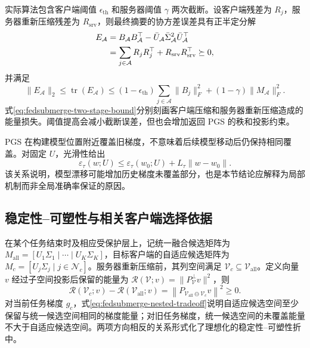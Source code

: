 实际算法包含客户端阈值 $\epsilon_{\mathrm{th}}$ 和服务器阈值 $\gamma$ 两次截断。设客户端残差为 $R_j$，服务器重新压缩残差为 $R_{\mathrm{srv}}$，则最终摘要的协方差误差具有正半定分解
\begin{align}
E_{\mathcal{A}}
&=
B_{\mathcal{A}}B_{\mathcal{A}}^{\top}
-
\bar U_{\mathcal{A}}\bar\Sigma_{\mathcal{A}}^2
\bar U_{\mathcal{A}}^{\top}
\notag\\
&=
\sum_{j\in\mathcal{A}}R_jR_j^{\top}
+
R_{\mathrm{srv}}R_{\mathrm{srv}}^{\top}
\succeq0,
\label{eq:fedsubmerge-two-stage-error}
\end{align}
并满足
\begin{equation}
\|E_{\mathcal{A}}\|_2
\leq
\operatorname{tr}(E_{\mathcal{A}})
\leq
(1-\epsilon_{\mathrm{th}})
\sum_{j\in\mathcal{A}}\|B_j\|_F^2
+
(1-\gamma)\|M_{\mathcal{A}}\|_F^2.
\label{eq:fedsubmerge-two-stage-bound}
\end{equation}
式\eqref{eq:fedsubmerge-two-stage-bound}分别刻画客户端压缩和服务器重新压缩造成的能量损失。阈值提高会减小截断误差，但也会增加返回 PGS 的秩和投影约束。

PGS 在构建模型位置附近覆盖旧梯度，不意味着后续模型移动后仍保持相同覆盖。对固定 $U$，光滑性给出
\begin{equation}
\varepsilon_{\tau}(w;U)
\leq
\varepsilon_{\tau}(w_0;U)
+
L_{\tau}\|w-w_0\|.
\label{eq:fedsubmerge-model-drift}
\end{equation}
该关系说明，模型漂移可能增加历史梯度未覆盖部分，也是本节结论应解释为局部机制而非全局准确率保证的原因。

\subsection{稳定性--可塑性与相关客户端选择依据}
\label{subsec:fedsubmerge-theory-plasticity}

在某个任务结束时及相应受保护层上，记统一融合候选矩阵为
$M_{\mathrm{all}}=[U_1\Sigma_1\mid\cdots\mid U_K\Sigma_K]$，目标客户端的自适应候选矩阵为
$M_c=[U_j\Sigma_j\mid j\in\mathcal{N}_c]$。服务器重新压缩前，其列空间满足
$\mathcal{V}_c\subseteq\mathcal{V}_{\mathrm{all}}$。定义向量 $v$ 经过子空间投影后保留的能量为
$\mathcal{R}(\mathcal{V};v)=\|P_{\mathcal{V}}^{\perp}v\|^2$，则
\begin{equation}
\mathcal{R}(\mathcal{V}_c;v)
-
\mathcal{R}(\mathcal{V}_{\mathrm{all}};v)
=
\left\|P_{\mathcal{V}_{\mathrm{all}}\ominus\mathcal{V}_c}v\right\|^2
\geq0.
\label{eq:fedsubmerge-nested-tradeoff}
\end{equation}
对当前任务梯度 $g_c$，式\eqref{eq:fedsubmerge-nested-tradeoff}说明自适应候选空间至少保留与统一候选空间相同的梯度能量；对旧任务梯度，统一候选空间的未覆盖能量不大于自适应候选空间。两项方向相反的关系形式化了理想化的稳定性--可塑性折中。

